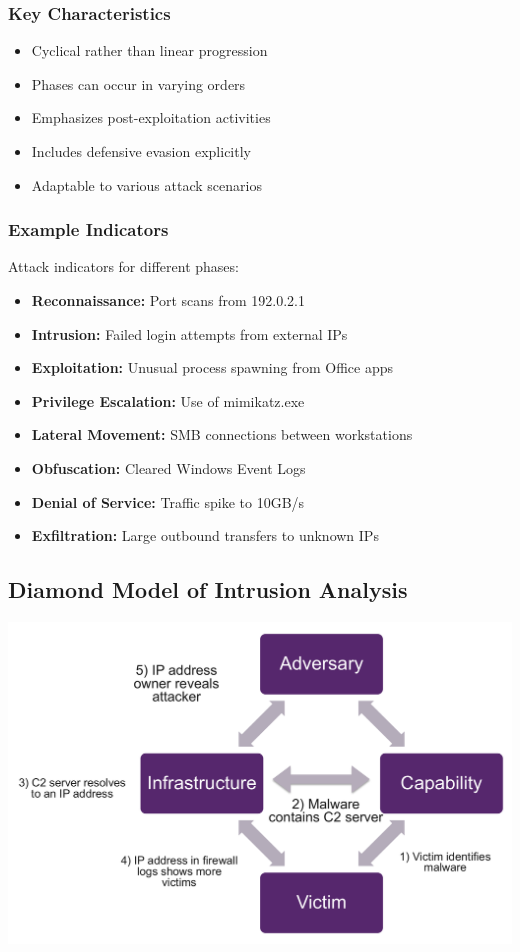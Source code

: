 \subsubsection{Key Characteristics}
\begin{itemize}
   \item Cyclical rather than linear progression
   \item Phases can occur in varying orders
   \item Emphasizes post-exploitation activities
   \item Includes defensive evasion explicitly
   \item Adaptable to various attack scenarios
\end{itemize}

\subsubsection{Example Indicators}
Attack indicators for different phases:
\begin{itemize}
   \item \textbf{Reconnaissance:} Port scans from 192.0.2.1
   \item \textbf{Intrusion:} Failed login attempts from external IPs
   \item \textbf{Exploitation:} Unusual process spawning from Office apps
   \item \textbf{Privilege Escalation:} Use of mimikatz.exe
   \item \textbf{Lateral Movement:} SMB connections between workstations
   \item \textbf{Obfuscation:} Cleared Windows Event Logs
   \item \textbf{Denial of Service:} Traffic spike to 10GB/s
   \item \textbf{Exfiltration:} Large outbound transfers to unknown IPs
\end{itemize}


\subsection{Diamond Model of Intrusion Analysis}
\includegraphics[width=\textwidth]{resources/09-diamond-model.png}

